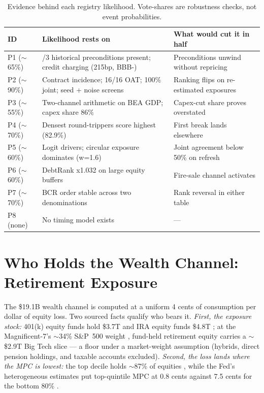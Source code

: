 \documentclass[11pt,a4paper]{article}
\begin{document}
\begin{table}[htbp]
\centering
\caption{Evidence behind each registry likelihood. Vote-shares are robustness checks, not event probabilities.}
    \label{tab:17-evidence-behind-each-registry}
\begin{tabular}{l>{\raggedright\arraybackslash}p{5.0cm}>{\raggedright\arraybackslash}p{5.2cm}}
\toprule
ID & Likelihood rests on & What would cut it in half \\
\midrule
P1 ($\sim$65\%) & 3/3 historical preconditions present; credit charging (215bp, BBB-) & Preconditions unwind without repricing \\
P2 ($\sim$90\%) & Contract incidence; 16/16 OAT; 100\% joint; seed + noise screens & Ranking flips on re-estimated exposures \\
P3 ($\sim$55\%) & Two-channel arithmetic on BEA GDP; capex share 86\% & Capex-cut share proves overstated \\
P4 ($\sim$70\%) & Densest round-trippers score highest (82.9\%) & First break lands elsewhere \\
P5 ($\sim$60\%) & Logit drivers; circular exposure dominates (w=1.6) & Joint agreement below 50\% on refresh \\
P6 ($\sim$60\%) & DebtRank x1.032 on large equity buffers & Fire-sale channel activates \\
P7 ($\sim$70\%) & BCR order stable across two denominations & Rank reversal in either table \\
P8 (none) & No timing model exists & --- \\
\bottomrule
\end{tabular}
\end{table}


\section{Who Holds the Wealth Channel: Retirement Exposure}\label{sec:appendix-retirement}
The \$19.1B wealth channel is computed at a uniform 4 cents of consumption
per dollar of equity loss. Two sourced facts qualify who bears it.
\emph{First, the exposure stock:} 401(k) equity funds hold \$3.7T and IRA
equity funds \$4.8T \citep{ici2026}; at the Magnificent-7's $\sim$34\%
S\&P~500 weight \citep{datatrek2025}, fund-held retirement equity carries a
$\sim$\$2.9T Big Tech slice --- a floor under a market-weight assumption
(hybrids, direct pension holdings, and taxable accounts excluded).
\emph{Second, the loss lands where the MPC is lowest:} the top decile holds
$\sim$87\% of equities \citep{feddfa2025}, while the Fed's heterogeneous
estimates put top-quintile MPC at 0.8 cents against 7.5 cents for the bottom
80\% \citep{fedfeds2025}.
\end{document}

